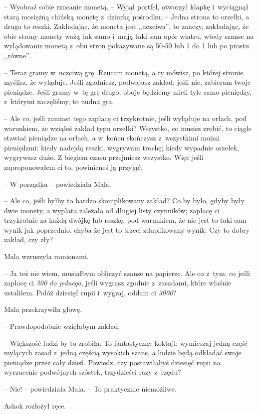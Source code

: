 \documentclass[oneside,polish,11pt,rmheadings]{mwbk}
\begin{document}
-- Wyobraź sobie rzucanie monetą. -- Wyjął portfel, otworzył klapkę i~wyciągnął starą mosiężną chińską monetę z~dziurką pośrodku. -- Jedna strona to orzełki, a druga to reszki. Zakładając, że moneta jest ,,uczciwa'', to znaczy, zakładając, że obie strony monety ważą tak samo i~mają taki sam opór wiatru, wtedy szanse na wylądowanie monetą z~obu stron pokazywane są 50-50 lub 1 do 1 lub po prostu ,,równe''.

-- Teraz gramy w~uczciwą grę. Rzucam monetą, a ty mówisz, po której stronie myślisz, że wyląduje. Jeśli zgadniesz, podwajasz zakład; jeśli nie, zabieram twoje pieniądze. Jeśli gramy w~tę grę długo, oboje będziemy mieli tyle samo pieniędzy, z~którymi zaczęliśmy, to nudna gra.

-- Ale co, jeśli zamiast tego zapłacę ci trzykrotnie, jeśli wyląduje na orłach, pod warunkiem, że wziąłeś zakład typu orzełki? Wszystko, co musisz zrobić, to ciągle stawiać pieniądze na orłach, a w~końcu skończysz z~wszystkimi moimi pieniędzmi: kiedy nadejdą reszki, wygrywam trochę; kiedy wypadnie orzełek, wygrywasz dużo. Z biegiem czasu przejmiesz wszystko. Więc jeśli zaproponowałem ci to, powinieneś ją przyjąć.

-- W porządku -- powiedziała Mala.

-- Ale co, jeśli byłby to bardzo skomplikowany zakład? Co by było, gdyby były dwie monety, a wypłata zależała od długiej listy czynników; zapłacę ci trzykrotnie za każdą dwójkę lub reszkę, pod warunkiem, że nie jest to taki sam wynik jak poprzednio, chyba że jest to trzeci zduplikowany wynik. Czy to dobry zakład, czy zły? 

Mala wzruszyła ramionami.

-- Ja też nie wiem, musiałbym obliczyć szanse na papierze. Ale co z~tym: co jeśli zapłacę ci \textit{300 do jednego}, jeśli wygrasz zgodnie z~zasadami, które właśnie ustaliłem. Połóż dziesięć rupii i~wygraj, oddam ci \textit{3000}?

Mala przekrzywiła głowę. 

-- Prawdopodobnie wzięłabym zakład. 

-- Większość ludzi by to zrobiła. To fantastyczny koktajl: wymieszaj jedną część mylących zasad z~jedną częścią wysokich szans, a ludzie będą odkładać swoje pieniądze przez cały dzień. Powiedz, czy postawiłabyś dziesięć rupii na wyrzucenie podwójnych szóstek, trzydzieści razy z~rzędu? 

-- Nie! -- powiedziała Mala. -- To praktycznie niemożliwe.

Ashok rozłożył ręce. 
\end{document}
